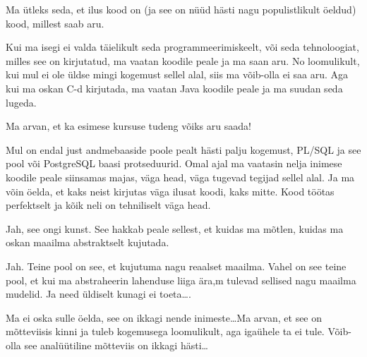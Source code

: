 
Ma ütleks seda, et ilus kood on (ja see on nüüd hästi nagu populistlikult öeldud) kood, millest saab aru. 

Kui ma isegi ei valda täielikult seda programmeerimiskeelt, või seda tehnoloogiat, milles see on kirjutatud, ma vaatan koodile peale ja ma saan aru. No loomulikult, kui mul ei ole üldse mingi kogemust sellel alal, siis ma võib-olla ei saa aru. Aga kui ma oskan C-d  kirjutada, ma vaatan Java koodile peale ja ma suudan seda lugeda. 


Ma arvan, et ka esimese kursuse tudeng võiks aru saada!

Mul on endal just andmebaaside poole pealt hästi palju kogemust, PL/SQL ja see pool või PostgreSQL baasi protseduurid. Omal ajal ma vaatasin nelja inimese koodile peale siinsamas majas, väga head, väga tugevad tegijad sellel alal. Ja ma võin öelda, et kaks neist kirjutas väga ilusat koodi, kaks mitte. Kood töötas perfektselt ja kõik neli on tehniliselt väga head. 


Jah, see ongi kunst. See hakkab peale sellest, et kuidas ma mõtlen, kuidas ma  oskan maailma abstraktselt kujutada. 


Jah. Teine pool on see, et kujutuma nagu reaalset maailma. Vahel on see teine pool, et kui ma abstraheerin lahenduse liiga ära,m tulevad sellised nagu maailma mudelid. Ja need üldiselt kunagi ei toeta\ldots. 


Ma ei oska sulle öelda, see on ikkagi nende inimeste\ldots Ma arvan, et see on mõtteviisis kinni ja tuleb kogemusega loomulikult, aga igaühele ta ei tule. Võib-olla see analüütiline mõtteviis on ikkagi hästi\ldots 

